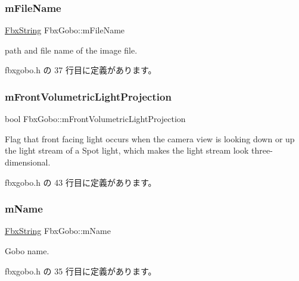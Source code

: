 \subsubsection{\texorpdfstring{m\+File\+Name}{mFileName}}
{\footnotesize\ttfamily \hyperlink{class_fbx_string}{Fbx\+String} Fbx\+Gobo\+::m\+File\+Name}



path and file name of the image file. 



 fbxgobo.\+h の 37 行目に定義があります。

\mbox{\label{class_fbx_gobo_a7d0ff5a850609339492d0cd218df352b}} 
\subsubsection{\texorpdfstring{m\+Front\+Volumetric\+Light\+Projection}{mFrontVolumetricLightProjection}}
{\footnotesize\ttfamily bool Fbx\+Gobo\+::m\+Front\+Volumetric\+Light\+Projection}



Flag that front facing light occurs when the camera view is looking down or up the light stream of a Spot light, which makes the light stream look three-\/dimensional. 



 fbxgobo.\+h の 43 行目に定義があります。

\mbox{\label{class_fbx_gobo_a4c72db9f7ab3356ed6efe27f271f20b1}} 
\subsubsection{\texorpdfstring{m\+Name}{mName}}
{\footnotesize\ttfamily \hyperlink{class_fbx_string}{Fbx\+String} Fbx\+Gobo\+::m\+Name}



Gobo name. 



 fbxgobo.\+h の 35 行目に定義があります。

\mbox{\label{class_fbx_gobo_a2dfb9b008dfb672a5de78e6dfffe0d89}} 
